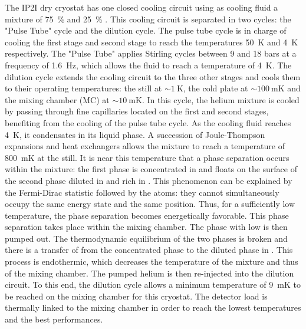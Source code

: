 The IP2I dry cryostat has one closed cooling circuit using as cooling fluid a mixture of \SI{75}{\percent}  and \SI{25}{\percent} . This cooling circuit is separated in two cycles: the "Pulse Tube" cycle and the dilution cycle. 
The pulse tube cycle is in charge of cooling the first stage and second stage to reach the temperatures \SI{50}{\kelvin} and \SI{4}{\kelvin} respectively. The "Pulse Tube" applies Stirling cycles between 9 and 18 bars at a frequency of \SI{1.6}{\Hz}, which allows the  fluid to reach a temperature of \SI{4}{\kelvin}.
The dilution cycle extends the cooling circuit to the three other stages and cools them to their operating temperatures: the still at $\sim\SI{1}{\kelvin}$, the cold plate at $\sim \SI{100}{\milli\kelvin}$ and the mixing chamber (MC) at $\sim \SI{10}{\milli\kelvin}$. In this cycle, the helium mixture is cooled by passing through fine capillaries located on the first and second stages, benefiting from the cooling of the pulse tube cycle. As the cooling fluid reaches \SI{4}{\kelvin}, it condensates in its liquid phase. A succession of Joule-Thompson expansions and heat exchangers allows the mixture to reach a temperature of \SI{800}{\milli\kelvin} at the still. It is near this temperature that a phase separation occurs within the mixture: the first phase is concentrated in  and floats on the surface of the second phase diluted in  and rich in . This phenomenon can be explained by the Fermi-Dirac statistic followed by the  atoms: they cannot simultaneously occupy the same energy state and the same position. Thus, for a sufficiently low temperature, the phase separation becomes energetically favorable. This phase separation takes place within the mixing chamber. The phase with low  is then pumped out. The thermodynamic equilibrium of the two phases is broken and there is a transfer of  from the concentrated phase to the diluted phase in . This process is endothermic, which decreases the temperature of the mixture and thus of the mixing chamber. The pumped helium  is then re-injected into the dilution circuit. To this end, the dilution cycle allows a minimum temperature of \SI{9}{\milli\kelvin} to be reached on the mixing chamber for this cryostat. The detector load is thermally linked to the mixing chamber in order to reach the lowest temperatures and the best performances.

